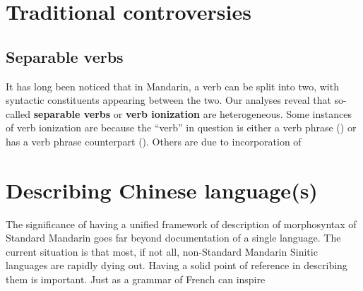 \documentclass[UTF8, a4paper, oneside, scheme=plain, 12pt]{ctexrep}
\newcommand*{\concept}[1]{\textbf{#1}}
\begin{document}
\section{Traditional controversies}

\subsection{Separable verbs}

It has long been noticed that in Mandarin,
a verb can be split into two, with syntactic constituents appearing between the two.
Our analyses reveal that so-called \concept{separable verbs} or \concept{verb ionization} are heterogeneous.
Some instances of verb ionization are because the ``verb'' in question
is either a verb phrase () or has a verb phrase counterpart ().
Others are due to incorporation of 

\section{Describing Chinese language(s)}

The significance of having a unified framework of description of morphosyntax of Standard Mandarin
goes far beyond documentation of a single language.
The current situation is that most, if not all, non-Standard Mandarin Sinitic languages
are rapidly dying out.
Having a solid point of reference in describing them is important.
Just as a grammar of French can inspire 

\printbibliography
\end{document}
